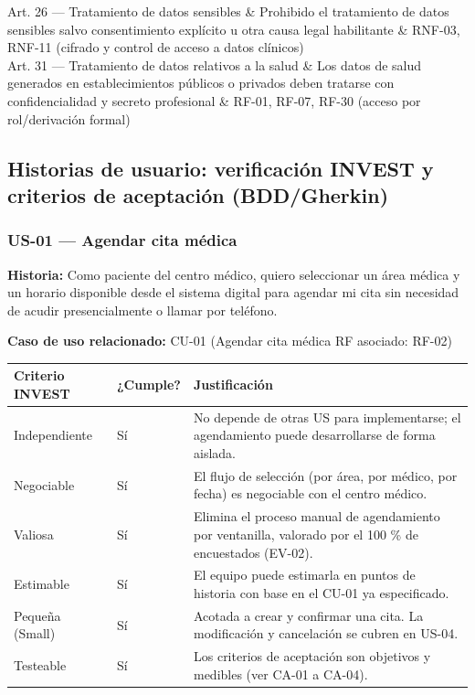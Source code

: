\documentclass[11pt,a4paper]{article}
\begin{document}
\begin{longtable}[]
		Art. 26 --- Tratamiento de datos sensibles & Prohibido el tratamiento de datos sensibles salvo consentimiento explícito u otra causa legal habilitante & RNF-03, RNF-11 (cifrado y control de acceso a datos clínicos) \\
		Art. 31 --- Tratamiento de datos relativos a la salud & Los datos de salud generados en establecimientos públicos o privados deben tratarse con confidencialidad y secreto profesional & RF-01, RF-07, RF-30 (acceso por rol/derivación formal) \\
	\end{longtable}
	
	
	\subsection{ Historias de usuario: verificación INVEST y criterios de aceptación (BDD/Gherkin)}
	
	\subsubsection{US-01 --- Agendar cita médica}
	
	\textbf{Historia:} Como paciente del centro médico, quiero seleccionar un área médica y un horario disponible desde el sistema digital para agendar mi cita sin necesidad de acudir presencialmente o llamar por teléfono.
	
	\textbf{Caso de uso relacionado:} CU-01 (Agendar cita médica \textbar{} RF asociado: RF-02)
	
	\begin{longtable}{p{} p{} p{}}
		
		
		\toprule
		\textbf{Criterio INVEST} &
		\textbf{¿Cumple?} &
		\textbf{Justificación} \\
		\midrule
		\endhead
		
		Independiente & Sí & No depende de otras US para implementarse; el agendamiento puede desarrollarse de forma aislada. \\
		Negociable & Sí & El flujo de selección (por área, por médico, por fecha) es negociable con el centro médico. \\
		Valiosa & Sí & Elimina el proceso manual de agendamiento por ventanilla, valorado por el 100 \% de encuestados (EV-02). \\
		Estimable & Sí & El equipo puede estimarla en puntos de historia con base en el CU-01 ya especificado. \\
		Pequeña (Small) & Sí & Acotada a crear y confirmar una cita. La modificación y cancelación se cubren en US-04. \\
		Testeable & Sí & Los criterios de aceptación son objetivos y medibles (ver CA-01 a CA-04). \\
		
		\bottomrule
	\end{longtable}
	
\end{document}
